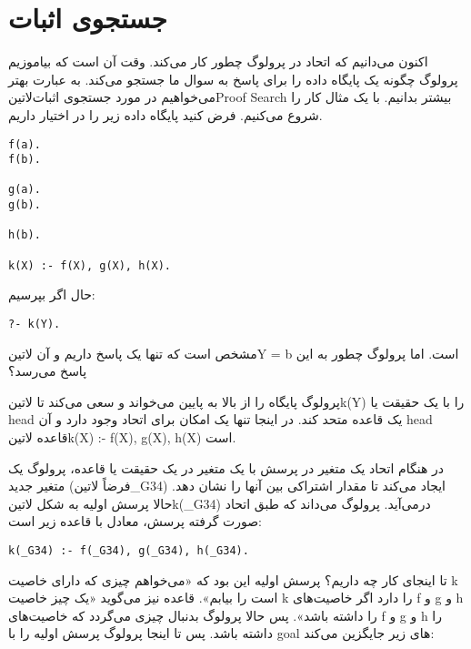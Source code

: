 \section{جستجوی اثبات}
اکنون می‌دانیم که اتحاد در پرولوگ چطور کار می‌کند. وقت آن است که بیاموزیم پرولوگ چگونه یک پایگاه داده را برای پاسخ به سوال ما جستجو می‌کند. به عبارت بهتر می‌خواهیم در مورد جستجوی اثبات‌لاتین{Proof Search} بیشتر بدانیم. با یک مثال کار را شروع می‌کنیم. فرض کنید پایگاه داده زیر را در اختیار داریم.

\begin{latin}
\begin{lstlisting}
f(a). 
f(b). 
    
g(a). 
g(b). 
    
h(b). 
    
k(X) :- f(X), g(X), h(X).
\end{lstlisting}
\end{latin}

حال اگر بپرسیم:

\begin{latin}
\begin{lstlisting}
?- k(Y).
\end{lstlisting}
\end{latin}

مشخص است که تنها یک پاسخ داریم و آن ‌لاتین{Y = b} است. اما پرولوگ چطور به این پاسخ می‌رسد؟

پرولوگ پایگاه را از بالا به پایین می‌خواند و سعی می‌کند تا ‌لاتین{k(Y)} را با یک حقیقت یا head یک قاعده متحد کند. در اینجا تنها یک امکان برای اتحاد وجود دارد و آن head قاعده ‌لاتین{k(X) :- f(X), g(X), h(X)} است.

در هنگام اتحاد یک متغیر در پرسش با یک متغیر در یک حقیقت یا قاعده، پرولوگ یک متغیر جدید (فرضاً ‌لاتین{\_G34}) ایجاد می‌کند تا مقدار اشتراکی بین آنها را نشان دهد. حالا پرسش اولیه به شکل ‌لاتین{k(\_G34)} درمی‌آید. پرولوگ می‌داند که طبق اتحاد صورت گرفته پرسش، معادل با قاعده زیر است:

\begin{latin}
\begin{lstlisting}
k(_G34) :- f(_G34), g(_G34), h(_G34).
\end{lstlisting}
\end{latin}

تا اینجای کار چه داریم؟ پرسش اولیه این بود که «می‌خواهم چیزی که دارای خاصیت k است را بیابم». قاعده نیز می‌گوید «یک چیز خاصیت k‌ را دارد اگر خاصیت‌های f و g و h را داشته باشد». پس حالا پرولوگ بدنبال چیزی می‌گردد که خاصیت‌های f و g و h را داشته باشد. پس تا اینجا پرولوگ پرسش اولیه را با goal های زیر جایگزین می‌کند:


